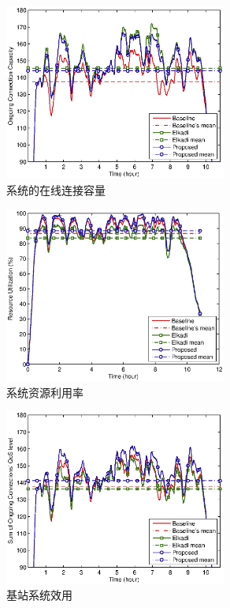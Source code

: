 %
\begin{figure}[htbp]
\centering
\includegraphics[width=0.65\textwidth] {cacop_conns_sum.eps}
\caption{系统的在线连接容量}\label{fig:chap_cacop:clock_onging_call_sum}
\end{figure}

% 
\begin{figure}[htbp]
\centering
\includegraphics[width=0.65\textwidth]{cacop_bw_utilization.eps}
\caption{系统资源利用率}\label{fig:chap_cacop:clock_bs_availble_bw}
\end{figure}

%
\begin{figure}[htbp]
\centering
\includegraphics[width=0.65\textwidth] {cacop_qos_sum.eps}
\caption{基站系统效用}\label{fig:chap_cacop:clock_bs_qos_sum}
\end{figure}

